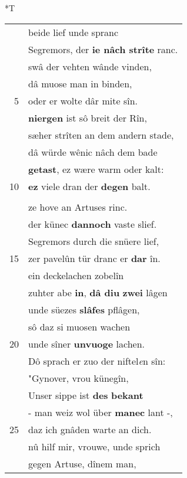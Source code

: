 \documentclass[8pt,a4paper,notitlepage]{article}
\begin{document}
\begin{table}[ht]
\begin{minipage}[t]{0.5\linewidth}
\end{minipage}
\hspace{0.5cm}
\begin{minipage}[t]{0.5\linewidth}
\small
\begin{center}*T
\end{center}
\begin{tabular}{rl}
 & beide lief unde spranc\\ 
 & Segremors, der \textbf{ie nâch strîte} ranc.\\ 
 & swâ der vehten wânde vinden,\\ 
 & dâ muose man in binden,\\ 
5 & oder er wolte dâr mite sîn.\\ 
 & \textbf{niergen} ist sô breit der Rîn,\\ 
 & sæher strîten an dem andern stade,\\ 
 & dâ würde wênic nâch dem bade\\ 
 & \textbf{getast}, ez wære warm oder kalt:\\ 
10 & \textbf{ez} viele dran der \textbf{degen} balt.\\ 
 & \textbf{\begin{large}S\end{large}us} kom der \textbf{snelle} jungelinc\\ 
 & ze hove an Artuses rinc.\\ 
 & der künec \textbf{dannoch} vaste slief.\\ 
 & Segremors durch die snüere lief,\\ 
15 & zer pavelûn tür dranc er \textbf{dar} în.\\ 
 & ein deckelachen zobelîn\\ 
 & zuhter abe \textbf{in}, \textbf{dâ diu} \textbf{zwei} lâgen\\ 
 & unde süezes \textbf{slâfes} pflâgen,\\ 
 & sô daz si muosen wachen\\ 
20 & unde sîner \textbf{unvuoge} lachen.\\ 
 & Dô sprach er zuo der niftel\textit{e}n sîn:\\ 
 & "Gynover, vrou künegîn,\\ 
 & Unser sippe ist \textbf{des} \textbf{bekant}\\ 
 & - man weiz wol über \textbf{manec} lant -,\\ 
25 & daz ich gnâden warte an dich.\\ 
 & nû hilf mir, vrouwe, unde sprich\\ 
 & gegen Artuse, dînem man,\\ 

\end{tabular}
\end{minipage}
\end{table}
\end{document}
